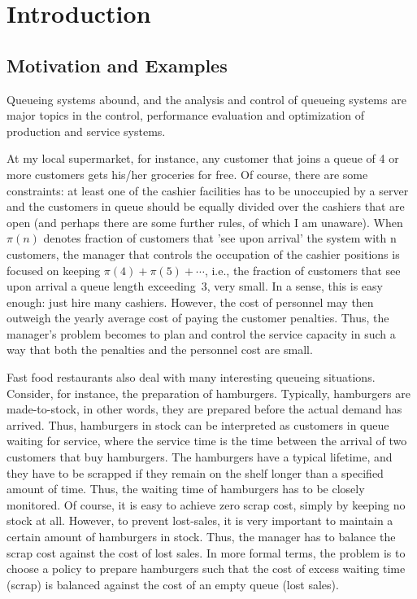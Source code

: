 \section{Introduction}
\subsection*{Motivation and Examples}
Queueing systems abound, and the analysis and control of queueing systems are major topics in the control, performance evaluation and optimization of production and service systems.


At my local supermarket, for instance, any customer that joins a queue of 4 or more customers gets his/her groceries for free.
Of course, there are some constraints: at least one of the cashier facilities has to be unoccupied by a server and the customers in queue should be equally divided over the cashiers that are open (and perhaps there are some further rules, of which I am unaware).
When $\pi(n)$ denotes fraction of customers that 'see upon arrival' the system with n customers, the manager that controls the occupation of the cashier positions is focused on keeping $\pi(4)+\pi(5)+\cdots$, i.e., the fraction of customers that see upon arrival a queue length exceeding~3, very small.
In a sense, this is easy enough: just hire many cashiers.
However, the cost of personnel may then outweigh the yearly average cost of paying the customer penalties.
Thus, the manager's problem becomes to plan and control the service capacity in such a way that both the penalties and the personnel cost are small.

Fast food restaurants also deal with many interesting queueing situations.
Consider, for instance, the preparation of hamburgers.
Typically, hamburgers are made-to-stock, in other words, they are prepared before the actual demand has arrived.
Thus, hamburgers in stock can be interpreted as customers in queue waiting for service, where the service time is the time between the arrival of two customers that buy hamburgers.
The hamburgers have a typical lifetime, and they have to be scrapped if they remain on the shelf longer than a specified amount of time.
Thus, the waiting time of hamburgers has to be closely monitored.
Of course, it is easy to achieve zero scrap cost, simply by keeping no stock at all.
However, to prevent lost-sales, it is very important to maintain a certain amount of hamburgers in stock.
Thus, the manager has to balance the scrap cost against the cost of lost sales.
In more formal terms, the problem is to choose a policy to prepare hamburgers such that the cost of excess waiting time (scrap) is balanced against the cost of an empty queue (lost sales).


